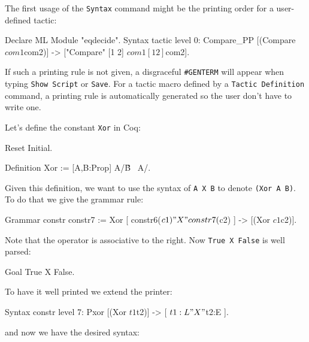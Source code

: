 \firstexample


The first usage of the \texttt{Syntax} command might be the printing
order for a user-defined tactic: 

\begin{coq_example*}
Declare ML Module "eqdecide".
Syntax tactic level 0:
  Compare_PP [(Compare $com1 $com2)]    -> 
            ["Compare" [1 2] $com1 [1 2] $com2].
\end{coq_example*}

If such a printing rule is not given, a disgraceful \verb+#GENTERM+
will appear when typing \texttt{Show Script} or \texttt{Save}. For
a tactic macro defined by a \texttt{Tactic Definition} command, a
printing rule is automatically generated so the user don't have to
write one.


Let's define the constant \verb+Xor+ in Coq:

\begin{coq_eval}
  Reset Initial.
\end{coq_eval}

\begin{coq_example*}
Definition Xor := [A,B:Prop] A/\~B \/ ~A/\B.
\end{coq_example*}

Given this definition, we want to use the syntax of \verb+A X B+
to denote \verb+(Xor A B)+. To do that we give the grammar rule:

\begin{coq_example}
Grammar constr constr7 :=
  Xor [ constr6($c1) "X" constr7($c2) ] -> [(Xor $c1 $c2)].
\end{coq_example}

Note that the operator is associative to the right.  
Now \verb+True X False+ is well parsed:

\begin{coq_example}
Goal True X False.
\end{coq_example}

To have it well printed we extend the printer:

\begin{coq_example}
Syntax constr level 7:
  Pxor  [(Xor  $t1  $t2)] -> [ $t1:L  " X "  $t2:E ].
\end{coq_example}

and now we have the desired syntax:

